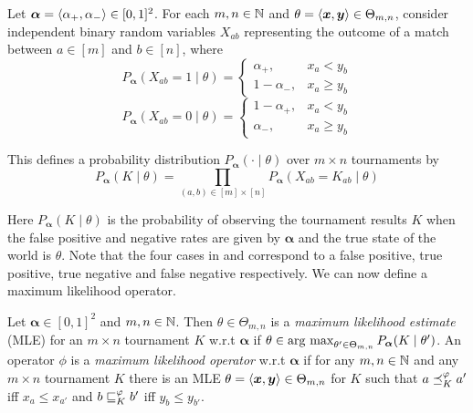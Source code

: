 \begin{definition}
   \label{tourn_def_probdist}

   Let $\bm{\alpha} = \langle {\alpha_+, \alpha_-} \rangle \in [0,1]^2$. For each $m,
   n \in \mathbb{N}$ and $\theta = \langle {\bm{x}, \bm{y}} \rangle \in \Theta_{m,n}$, consider
   independent binary random variables $X_{ab}$ representing the outcome of a
   match between $a \in [m]$ and $b \in [n]$, where
   \begin{equation}
        \label{tourn_eqn_probdist_random_var_one}
        P_{\bm{\alpha}}(X_{ab} = 1 \mid \theta)
        = \begin{cases}
            \alpha_+,& x_a < y_b \\
            1 - \alpha_-,& x_a \ge y_b
        \end{cases}
   \end{equation}
   \begin{equation}
        \label{tourn_eqn_probdist_random_var_zero}
        P_{\bm{\alpha}}(X_{ab} = 0 \mid \theta)
        = \begin{cases}
            1 - \alpha_+,& x_a < y_b \\
            \alpha_-,& x_a \ge y_b
        \end{cases}
   \end{equation}

   This defines a probability distribution $P_{\bm{\alpha}}({\cdot} \mid
   \theta)$ over $m \times n$ tournaments by
   \[
      P_{\bm{\alpha}}(K \mid \theta) = \prod_{(a, b) \in [m] \times [n]}{
           P_{\bm{\alpha}}(X_{ab} = K_{ab} \mid \theta)
      }
   \]
\end{definition}

Here $P_{\bm{\alpha}}(K \mid \theta)$ is the probability of observing the
tournament results $K$ when the false positive and negative rates are given by
$\bm{\alpha}$ and the true state of the world is $\theta$. Note that the
four cases in  and
 correspond to a false positive, true
positive, true negative and false negative respectively. We can now define a
maximum likelihood operator.

\begin{definition}

    Let $\bm{\alpha} \in [0,1]^2$ and $m, n \in \mathbb{N}$. Then $\theta \in
    \Theta_{m,n}$ is a \emph{maximum likelihood estimate} (MLE) for an $m
    \times n$ tournament $K$ w.r.t $\bm{\alpha}$ if $\theta \in
    \operatorname*{arg\ max}_{\theta' \in \Theta_{m,n}}{P_{\bm{\alpha}}(K \mid \theta')}$. An
    operator $\phi$ is a \emph{maximum likelihood operator} w.r.t
    $\bm{\alpha}$ if for any $m, n \in \mathbb{N}$ and any $m \times n$ tournament $K$
    there is an MLE $\theta = \langle {\bm{x}, \bm{y}} \rangle \in \Theta_{m,n}$ for $K$
    such that $a \preceq_K^\varphi a'$ iff $x_a \le x_{a'}$ and $b \sqsubseteq_K^\varphi b'$
    iff $y_b \le y_{b'}$.

\end{definition}

